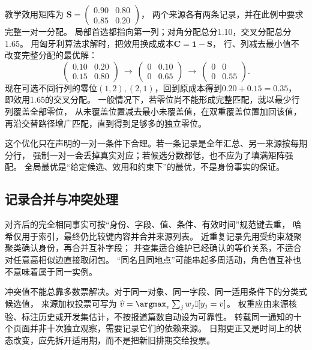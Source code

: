 教学效用矩阵为
$\bm{S}=\left(\begin{smallmatrix}0.90&0.80\\0.85&0.20\end{smallmatrix}\right)$，
两个来源各有两条记录，并在此例中要求完整一对一分配。
局部首选都指向第一列；对角分配总分1.10，交叉分配总分1.65。
用匈牙利算法求解时，把效用换成成本$\bm{C}=\bm{1}-\bm{S}$，
行、列减去最小值不改变完整分配的最优解：
\begin{equation}
  \begin{pmatrix}0.10&0.20\\0.15&0.80\end{pmatrix}
  \ \longrightarrow\
  \begin{pmatrix}0&0.10\\0&0.65\end{pmatrix}
  \ \longrightarrow\
  \begin{pmatrix}0&0\\0&0.55\end{pmatrix}.
  \label{eq:nlp-extraction-hungarian}
\end{equation}
现在可选不同行列的零位$(1,2),(2,1)$，回到原成本得到$0.20+0.15=0.35$，
即效用1.65的交叉分配。
一般情况下，若零位尚不能形成完整匹配，就以最少行列覆盖全部零位，
从未覆盖位置减去最小未覆盖值，在双重覆盖位置加回该值，
再沿交替路径增广匹配，直到得到足够多的独立零位。

这个优化只在声明的一对一条件下合理。若一条记录是全年汇总、另一来源按每期分行，
强制一对一会丢掉真实对应；若候选分数都低，也不应为了填满矩阵强配。
全局最优是“给定候选、效用和约束下”的最优，不是身份事实的保证。

\subsection{记录合并与冲突处理}
\label{sec:nlp-extraction-merge}

对齐后的完全相同事实可按“身份、字段、值、条件、有效时间”规范键去重，
哈希仅用于索引，最终仍比较键内容并合并来源列表。
近重复记录先用受约束凝聚聚类确认身份，再合并互补字段；
并查集适合维护已经确认的等价关系，不适合对任意高相似边直接取闭包。
“同名且同地点”可能串起多周活动，角色值互补也不意味着属于同一实例。

冲突值不能总靠多数票解决。对于同一对象、同一字段、同一适用条件下的分类式候选值，
来源加权投票可写为
$\widehat{v}=\argmax_v\sum_jw_j\mathbb{I}[y_j=v]$。
权重应由来源核验、标注历史或开发集估计，不按报道篇数自动设为可靠性。
转载同一通知的十个页面并非十次独立观察，需要记录它们的依赖来源。
日期更正又是时间上的状态改变，应先拆开适用期，而不是把新旧排期交给投票。

